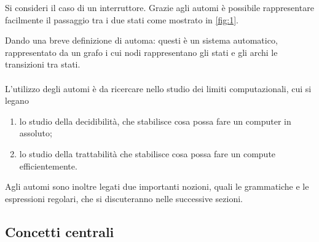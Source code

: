 \documentclass{subfiles}
\begin{document}
Si consideri il caso di un interruttore. Grazie agli automi è possibile rappresentare facilmente il passaggio tra i due stati come mostrato in \ref{fig:1}.
 \label{sec:1}

\noindent Dando una breve definizione di automa: questi è un sistema automatico, rappresentato da un grafo i cui nodi rappresentano gli stati e gli archi le transizioni tra stati.
\\ \\
L'utilizzo degli automi è da ricercare nello studio dei limiti computazionali, cui si legano
\begin{enumerate}
    \item lo studio della decidibilità, che stabilisce cosa possa fare un computer in assoluto;
    \item lo studio della trattabilità che stabilisce cosa possa fare un compute efficientemente.
\end{enumerate}

\noindent Agli automi sono inoltre legati due importanti nozioni, quali le grammatiche e le espressioni regolari, che si discuteranno nelle successive sezioni.

\subsection{Concetti centrali}

\end{document}
